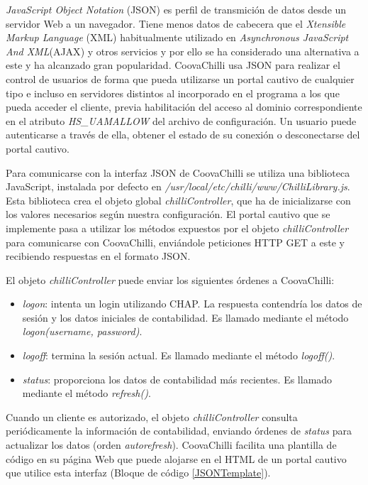\emph{JavaScript Object Notation} (JSON) es perfil de transmición de datos desde un servidor Web a un navegador. Tiene menos datos de cabecera que el \emph{Xtensible Markup Language} (\acrshort{XML}) habitualmente utilizado en \emph{Asynchronous JavaScript And XML}(\acrshort{AJAX}) y otros servicios y por ello se ha considerado una alternativa a este y ha alcanzado gran popularidad. CoovaChilli usa JSON para realizar el control de usuarios de forma que pueda utilizarse un portal cautivo de cualquier tipo e incluso en servidores distintos al incorporado en el programa a los que pueda acceder el cliente, previa habilitación del acceso al dominio correspondiente en el atributo \emph{HS\_UAMALLOW} del archivo de configuración. Un usuario puede autenticarse a través de ella, obtener el estado de su conexión o desconectarse del portal cautivo.

Para comunicarse con la interfaz JSON de CoovaChilli se utiliza una biblioteca JavaScript, instalada por defecto en \emph{/usr/local/etc/chilli/www/ChilliLibrary.js}. Esta biblioteca crea el objeto global \emph{chilliController}, que ha de inicializarse con los valores necesarios según nuestra configuración. El portal cautivo que se implemente pasa a utilizar los métodos expuestos por el objeto \emph{chilliController} para comunicarse con CoovaChilli, enviándole peticiones HTTP GET a este y recibiendo respuestas en el formato JSON.

El objeto \emph{chilliController} puede enviar los siguientes órdenes a CoovaChilli:

\begin{itemize}
\item \emph{logon}: intenta un login utilizando CHAP. La respuesta contendría los datos de sesión y los datos iniciales de contabilidad. Es llamado mediante el método \emph{logon(username, password)}.
\item \emph{logoff}: termina la sesión actual. Es llamado mediante el método \emph{logoff()}.
\item \emph{status}: proporciona los datos de contabilidad más recientes. Es llamado mediante el método \emph{refresh()}.
\end{itemize}


Cuando un cliente es autorizado, el objeto \emph{chilliController} consulta periódicamente la información de contabilidad, enviando órdenes de \emph{status} para actualizar los datos (orden \emph{autorefresh}).
CoovaChilli facilita una plantilla de código en su página Web que puede alojarse en el HTML de un portal cautivo que utilice esta interfaz (Bloque de código \ref{JSONTemplate}).

